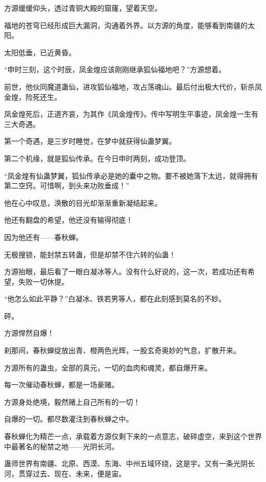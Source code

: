 
\begin{this_body}

方源缓缓仰头，透过青铜大殿的窟窿，望着天空。

福地的苍穹已经形成巨大漏洞，沟通着外界。以方源的角度，能够看到南疆的太阳。

太阳低垂，已近黄昏。

“申时三刻，这个时辰，凤金煌应该刚刚继承狐仙福地吧？”方源想着。

前世，他伙同魔道蛊仙，进攻狐仙福地，攻占荡魂山。最后付出极大代价，斩杀凤金煌，险死还生。

凤金煌死后，正道齐哀，为其作《凤金煌传》。传中写明生平事迹，凤金煌一生有三大奇遇。

第一个奇遇，是三岁时睡觉，在梦中就获得仙蛊梦翼。

第二个机缘，就是狐仙传承。在今日申时两刻，成功登顶。

“凤金煌有仙蛊梦翼，狐仙传承必是她的囊中之物。要不被她落下太远，就得拥有第二空窍。可惜啊，到头来功败垂成！”

他在心中叹息，涣散的目光却渐渐重新凝结起来。

他还有翻盘的希望，他还没有输得彻底！

因为他还有——春秋蝉。

无极搜锁，能封禁五转蛊，但是却禁不住六转的仙蛊！

方源抬眼，最后看了一眼白凝冰等人。没有什么好说的，这一次，若成功还有希望，失败一切休提。

“他怎么如此平静？”白凝冰、铁若男等人，都在此刻感到莫名的不妙。

砰。

方源悍然自爆！

刹那间，春秋蝉绽放出青、橙两色光辉，一股玄奇奥妙的气息，扩散开来。

方源所有的蛊虫，全部的真元，一切的血肉和魂灵，都自爆开来。

每一次催动春秋蝉，都是一场豪赌。

方源身处绝境，毅然赌上自己所有的一切！

自爆的一切。都尽数灌注到春秋蝉之中。

春秋蝉化为精芒一点，承载着方源仅剩下来的一点意志，破碎虚空，来到这个世界中最著名的秘禁之地——光阴长河。

蛊师世界有南疆、北原、西漠、东海、中州五域环绕，这是宇。又有一条光阴长河，贯穿过去、现在、未来，便是宙。


\end{this_body}
